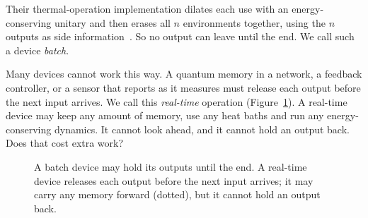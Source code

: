 \documentclass[11pt]{article}
\theoremstyle{definition}
\theoremstyle{remark}
\begin{document}
Their thermal-operation implementation dilates each use with an energy-conserving unitary and then erases all $n$ environments together, using the $n$ outputs as side information~\cite[Sec.~7]{FBB21}. So no output can leave until the end. We call such a device \emph{batch}.

Many devices cannot work this way. A quantum memory in a network, a feedback controller, or a sensor that reports as it measures must release each output before the next input arrives. We call this \emph{real-time} operation (Figure~\ref{fig:devices}). A real-time device may keep any amount of memory, use any heat baths and run any energy-conserving dynamics. It cannot look ahead, and it cannot hold an output back. Does that cost extra work?

\begin{figure}[t]
\centering
{}
\caption{A batch device may hold its outputs until the end. A real-time device releases each output before the next input arrives; it may carry any memory forward (dotted), but it cannot hold an output back.}
\label{fig:devices}
\end{figure}
\end{document}
